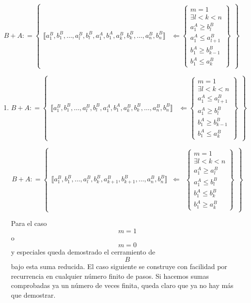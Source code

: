 \[{{B + A}{: =}}\begin{Bmatrix}
{⟦{{a_{1}^{B},b_{1}^{B}},\ldots,{a_{l}^{B},b_{l}^{B}},{a_{1}^{A},b_{1}^{A}},{a_{k}^{B},b_{k}^{B}},\ldots,{a_{n}^{B},b_{n}^{B}}}⟧} & {\Leftarrow\begin{Bmatrix}
{m = 1} \\
{\exists{{l < k} < n}} \\
{a_{1}^{A} \geq b_{l}^{B}} \\
{a_{1}^{A} \leq a_{l + 1}^{B}} \\
{b_{1}^{A} \geq b_{k - 1}^{B}} \\
{b_{1}^{A} \leq a_{k}^{B}}
\end{Bmatrix}}
\end{Bmatrix}\]

\begin{enumerate}
\def\labelenumi{\arabic{enumi}.}
\setcounter{enumi}{4}
\item
  \[{{B + A}{: =}}\begin{Bmatrix}
  {⟦{{a_{1}^{B},b_{1}^{B}},\ldots,{a_{l}^{B},b_{l}^{B}},{a_{1}^{A},b_{1}^{A}},{a_{k}^{B},b_{k}^{B}},\ldots,{a_{n}^{B},b_{n}^{B}}}⟧} & {\Leftarrow\begin{Bmatrix}
  {m = 1} \\
  {\exists{{l < k} < n}} \\
  {a_{1}^{A} \leq a_{l + 1}^{B}} \\
  {a_{1}^{A} \geq b_{l}^{B}} \\
  {b_{1}^{A} \geq b_{k - 1}^{B}} \\
  {b_{1}^{A} \leq a_{k}^{B}}
  \end{Bmatrix}}
  \end{Bmatrix}\]

  \[{{B + A}{: =}}\begin{Bmatrix}
  {⟦{{a_{1}^{B},b_{1}^{B}},\ldots,{a_{l}^{B},b_{k}^{B}},{a_{k + 1}^{B},b_{k + 1}^{B}},\ldots,{a_{n}^{B},b_{n}^{B}}}⟧} & \Leftarrow & \begin{Bmatrix}
  {m = 1} \\
  {\exists{{l < k} < n}} \\
  {a_{1}^{A} \geq a_{l}^{B}} \\
  {a_{1}^{A} \leq b_{l}^{B}} \\
  {b_{1}^{A} \leq b_{k}^{B}} \\
  {b_{1}^{A} \geq a_{k}^{B}}
  \end{Bmatrix}
  \end{Bmatrix}\]

  Para el caso \[m = 1\] o \[m = 0\] y especiales queda demostrado el
  cerramiento de \[B\]bajo esta suma reducida. El caso siguiente se
  construye con facilidad por recurrencia en cualquier número finito de
  pasos. Si hacemos sumas comprobadas ya un número de veces finita,
  queda claro que ya no hay más que demostrar.


\end{enumerate}
